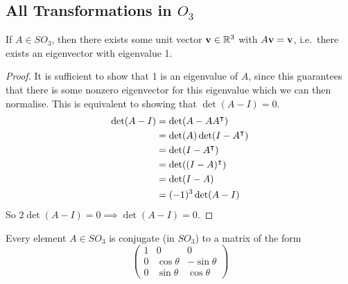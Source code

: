 \subsection{All Transformations in \(O_3\)}
\begin{theorem}
	If \(A \in SO_3\), then there exists some unit vector \(\vb v \in \mathbb R^3\) with \(A\vb v = \vb v\), i.e.\ there exists an eigenvector with eigenvalue 1.
\end{theorem}
\begin{proof}
	It is sufficient to show that 1 is an eigenvalue of \(A\), since this guarantees that there is some nonzero eigenvector for this eigenvalue which we can then normalise. This is equivalent to showing that \(\det (A - I) = 0\).
	\begin{align*}
		\det(A - I) & = \det(A - AA^\intercal)       \\
		            & = \det(A)\det(I - A^\intercal) \\
		            & = \det(I - A^\intercal)        \\
		            & = \det((I - A)^\intercal)      \\
		            & = \det(I - A)                   \\
		            & = (-1)^3\det(A - I)
	\end{align*}
	So \(2\det(A - I) = 0 \implies \det(A - I) = 0\).
\end{proof}
\begin{corollary}
	Every element \(A \in SO_3\) is conjugate (in \(SO_3\)) to a matrix of the form
	\[ \begin{pmatrix}
			1 & 0           & 0            \\
			0 & \cos \theta & -\sin \theta \\
			0 & \sin \theta & \cos \theta
		\end{pmatrix} \]
\end{corollary}
